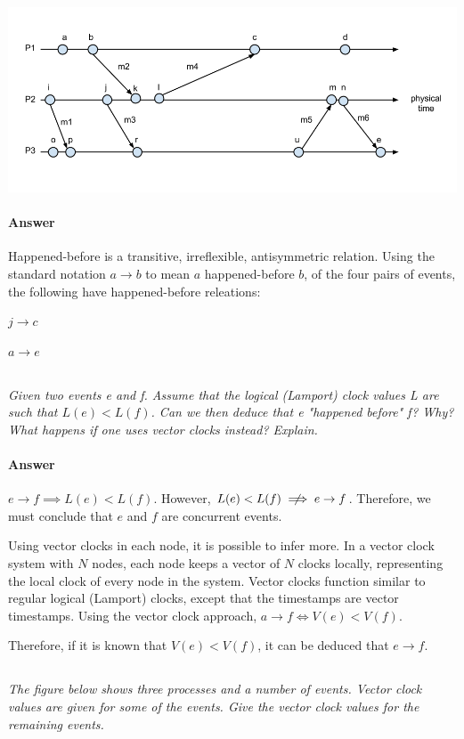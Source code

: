 \documentclass{article}
\newcommand{\question}[1]{\subsection{}\textit{#1}\bigskip}
\newcommand{\answer}{\paragraph{Answer}}
\begin{document}
\includegraphics[width=\textwidth]{images/T3-1.png}

\answer
Happened-before is a transitive, irreflexible, antisymmetric relation.
Using the standard notation $ a \rightarrow b $ to mean $ a $ happened-before $ b$, of the four pairs of events, the following have happened-before releations:

\begin{itemize}
\begin{centering}
    \item{$ j \rightarrow c $}
    \item{$ a \rightarrow e $}
    \\
\end{centering}
\end{itemize}

\question{Given two events e and f. Assume that the logical (Lamport) clock values L are such that $L (e) < L (f)$. Can we then deduce that e "happened before" f? Why? What happens if one uses vector clocks instead? Explain.}

\answer
$ e \rightarrow f \implies L(e) < L(f) $. However, $ L(e) < L(f) \centernot\implies e \rightarrow f $.
Therefore, we must conclude that $ e $ and $ f $ are concurrent events.

Using vector clocks in each node, it is possible to infer more.
In a vector clock system with $ N $ nodes, each node keeps a vector of $ N $ clocks locally, representing the local clock of every node in the system.
Vector clocks function similar to regular logical (Lamport) clocks, except that the timestamps are vector timestamps.
Using the vector clock approach, $ a \rightarrow f \iff V(e) < V(f) $.

Therefore, if it is known that $ V(e) < V(f) $, it can be deduced that $ e \rightarrow f $.

\question{The figure below shows three processes and a number of events. Vector clock values are given for some of the events. Give the vector clock values for the remaining events.}
\end{document}
